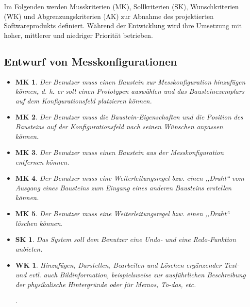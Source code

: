 \documentclass[parskip=full]{scrartcl}
\begin{document}
Im Folgenden werden \gls{Musskriterien} (MK), \gls{Sollkriterien} (SK), \gls{Wunschkriterien} (WK) und \gls{Abgrenzungskriterien} (AK) zur Abnahme des projektierten Softwareprodukts definiert. Während der Entwicklung wird ihre Umsetzung mit hoher, mittlerer und niedriger Priorität betrieben.

\newtheorem{MussKrit}{MK}
\newtheorem{SollKrit}{SK}
\newtheorem{WunschKrit}{WK}


\subsection{Entwurf von Messkonfigurationen}

\begin{itemize}
	
	\item 
	\begin{MussKrit} 			
		Der Benutzer muss einen Baustein zur Messkonfiguration hinzufügen können, d. h. er soll einen Prototypen auswählen und das Bausteinexemplars auf dem Konfigurationsfeld platzieren können. 
	\end{MussKrit}
	
	\item 
	\begin{MussKrit} 		
		Der Benutzer muss die Baustein-Eigenschaften und die Position des Bausteins auf der Konfigurationsfeld nach seinen Wünschen anpassen können.
	\end{MussKrit}
	
	\item 
	\begin{MussKrit} 			
		Der Benutzer muss einen Baustein aus der Messkonfiguration entfernen können.
	\end{MussKrit}
	
	\item 
	\begin{MussKrit} 			
		Der Benutzer muss eine Weiterleitungsregel bzw. einen ,,Draht`` vom Ausgang eines Bausteins zum Eingang eines anderen Bausteins erstellen können.
	\end{MussKrit}
	
	\item 
	\begin{MussKrit} 			
		Der Benutzer muss eine Weiterleitungsregel bzw. einen ,,Draht`` löschen können.
	\end{MussKrit}
	
	\item 
	\begin{SollKrit} 			
		Das System soll dem Benutzer eine Undo- und eine Redo-Funktion anbieten.
	\end{SollKrit}
			
	\item 
	\begin{WunschKrit} 
		Hinzufügen, Darstellen, Bearbeiten und Löschen ergänzender Text- und evtl. auch Bildinformation, beispielsweise zur ausführlichen Beschreibung der physikalische Hintergründe oder für Memos, To-dos, etc.
	\end{WunschKrit}.
	
\end{itemize}
\end{document}
